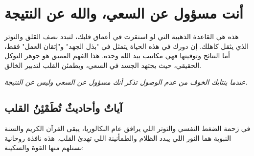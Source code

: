 \documentclass[12pt,a4paper]{book}
\newcommand{\quoteAr}[1]{%
	\begin{myquote}
		\itshape #1
	\end{myquote}
}
\begin{document}
	
	\section{أنت مسؤول عن السعي، والله عن النتيجة}
	
	هذه هي القاعدة الذهبية التي لو استقرت في أعماق قلبك، لتبدد نصف القلق والتوتر الذي يثقل كاهلك. إن دورك في هذه الحياة يتمثل في "بذل الجهد" و"إتقان العمل" فقط، أما النتائج وتوقيتها فهي مكاتيب بيد الله وحده. هذا الفهم العميق هو جوهر التوكل الحقيقي، حيث يجتهد الجسد في السعي، ويطمئن القلب لتدبير الخالق.
	
	\quoteAr{عندما ينتابك الخوف من عدم الوصول تذكر أنك مسؤول عن السعي وليس عن النتيجة.}
	
	\subsection*{آياتٌ وأحاديثٌ تُطَمْئِنُ القلب}
	في زحمة الضغط النفسي والتوتر اللي يرافق عام البكالوريا، يبقى القرآن الكريم والسنة النبوية هما النور اللي يبدد الظلام والطمأنينة اللي تهدئ القلب. هذه نافذة روحانية نستلهم منها القوة والسكينة:
\end{document}
